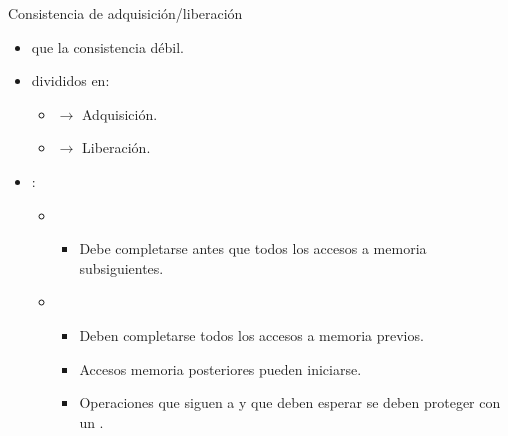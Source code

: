 \begin{frame}[t]{Consistencia de adquisición/liberación}
\begin{itemize}
  \item {} que la consistencia débil.
  \item  {} divididos en:
    \begin{itemize}
      \item {} $\rightarrow$ Adquisición.
      \item {} $\rightarrow$ Liberación.
    \end{itemize}

  \item {}:
    \begin{itemize}
      \item {}
        \begin{itemize}
          \item Debe completarse antes que todos los accesos a memoria subsiguientes.
        \end{itemize}
      \item {}
        \begin{itemize}
          \item Deben completarse todos los accesos a memoria previos.
          \item Accesos memoria posteriores  pueden iniciarse.
          \item Operaciones que siguen a  y que deben esperar se deben proteger con un .
        \end{itemize}
    \end{itemize}
\end{itemize}
\end{frame}
